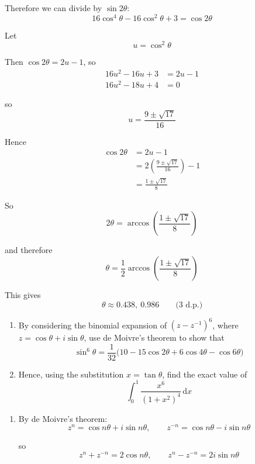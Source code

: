 \documentclass[leqno]{article}
\begin{document}
\begin{enumerate}[
  label=\textbf{\arabic*.},
  leftmargin=*,
  topsep=0pt,
  partopsep=0pt,
  parsep=0pt
]
\begin{djsSolution}
\begin{enumerate}[label=\textbf{(\alph*)}]
Therefore we can divide by $\sin 2\theta$:
\[
16\cos^4\theta-16\cos^2\theta+3=\cos 2\theta
\]

Let
\[
u=\cos^2\theta
\]

Then $\cos 2\theta=2u-1$, so
\begin{align*}
16u^2-16u+3&=2u-1 \\
16u^2-18u+4&=0
\end{align*}

so
\[
u=\frac{9\pm\sqrt{17}}{16}
\]

Hence
\begin{align*}
\cos 2\theta
&=2u-1 \\
&=2\left(\frac{9\pm\sqrt{17}}{16}\right)-1 \\
&=\frac{1\pm\sqrt{17}}{8}
\end{align*}

So
\[
2\theta=\arccos\left(\frac{1\pm\sqrt{17}}{8}\right)
\]

and therefore
\[
\theta=\frac12\arccos\left(\frac{1\pm\sqrt{17}}{8}\right)
\]

This gives
\[
\theta\approx 0.438,\ 0.986\qquad\text{(3 d.p.)}
\]
\end{enumerate}
\end{djsSolution}


\newpage

\questionitem

\begin{enumerate}[label=\textbf{(\alph*)}]
  \item By considering the binomial expansion of $(z-z^{-1})^6$, where $z=\cos\theta+i\sin\theta$, use de Moivre's theorem to show that
  \[
  \sin^6\theta=\frac{1}{32}\bigl(10-15\cos 2\theta+6\cos 4\theta-\cos 6\theta\bigr)
  \]
  \item Hence, using the substitution $x=\tan\theta$, find the exact value of
  \[
  \int_0^1 \frac{x^6}{(1+x^2)^4}\,\mathrm{d}x
  \]
\end{enumerate}

\vspace*{10pt}

\begin{djsSolution}
\begin{enumerate}[label=\textbf{(\alph*)}]
  \item By de Moivre's theorem:
  \[
  z^n=\cos n\theta+i\sin n\theta,
  \qquad
  z^{-n}=\cos n\theta-i\sin n\theta
  \]

  so
  \[
  z^n+z^{-n}=2\cos n\theta,
  \qquad
  z^n-z^{-n}=2i\sin n\theta
  \]


\end{enumerate}
\end{djsSolution}
\end{enumerate}
\end{document}
